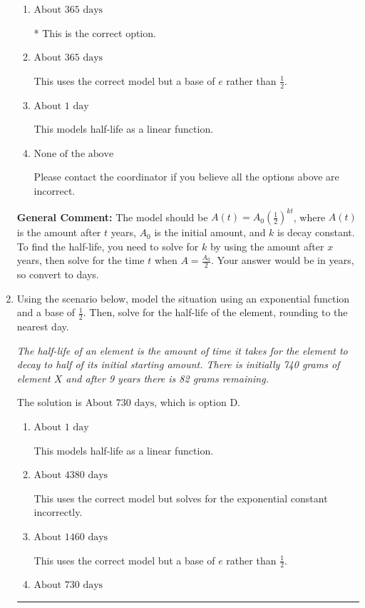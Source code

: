 \documentclass{extbook}[14pt]
\newcommand{\litem}[1]{\item #1

\rule{\textwidth}{0.4pt}}
\begin{document}
\begin{enumerate}
{\begin{enumerate}[label=\Alph*.]
This uses the correct model but solves for the exponential constant incorrectly.
\item \( \text{About } 365 \text{ days} \)

* This is the correct option.
\item \( \text{About } 365 \text{ days} \)

This uses the correct model but a base of $e$ rather than $\frac{1}{2}$.
\item \( \text{About } 1 \text{ day} \)

This models half-life as a linear function.
\item \( \text{None of the above} \)

Please contact the coordinator if you believe all the options above are incorrect.
\end{enumerate}

\textbf{General Comment:} The model should be $A(t) = A_0 (\frac{1}{2})^{kt}$, where $A(t)$ is the amount after $t$ years, $A_0$ is the initial amount, and $k$ is decay constant. To find the half-life, you need to solve for $k$ by using the amount after $x$ years, then solve for the time $t$ when $A = \frac{A_0}{2}$. Your answer would be in years, so convert to days.
}
\litem{
Using the scenario below, model the situation using an exponential function and a base of $\frac{1}{2}$. Then, solve for the half-life of the element, rounding to the nearest day.

\begin{center}
    \textit{ The half-life of an element is the amount of time it takes for the element to decay to half of its initial starting amount. There is initially 740 grams of element $X$ and after 9 years there is 82 grams remaining. }
\end{center}
The solution is \( \text{About } 730 \text{ days} \), which is option D.\begin{enumerate}[label=\Alph*.]
\item \( \text{About } 1 \text{ day} \)

This models half-life as a linear function.
\item \( \text{About } 4380 \text{ days} \)

This uses the correct model but solves for the exponential constant incorrectly.
\item \( \text{About } 1460 \text{ days} \)

This uses the correct model but a base of $e$ rather than $\frac{1}{2}$.
\item \( \text{About } 730 \text{ days} \)


\end{enumerate}}
\end{enumerate}
\end{document}
